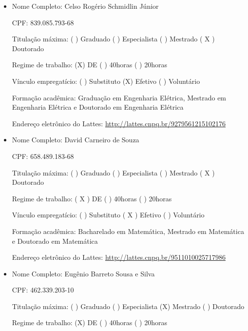 \documentclass{paper}
\def\web#1{\href{#1}{#1}}
\begin{document}
\begin{itemize}
 CPF: 234.457.933-87

 Titulação máxima: (  ) Graduado (  ) Especialista  (X) Mestrado ( ) Doutorado

 Regime de trabalho: (X) DE ( ) 40horas ( ) 20horas

 Vínculo empregatício: (  ) Substituto (X) Efetivo  (  ) Voluntário

 Formação acadêmica: Graduação em Agronomia, Especialização em Segurança do Trabalho e Mestrado em Engenharia Civil

 Endereço eletrônico do Lattes: \web{http://lattes.cnpq.br/3534055362942935}


\item Nome Completo: Celso Rogério Schmidlin Júnior

 CPF: 839.085.793-68

 Titulação máxima: (  ) Graduado  (  ) Especialista  (  ) Mestrado ( X ) Doutorado

 Regime de trabalho: (X) DE  (  ) 40horas (  ) 20horas

 Vínculo empregatício: (  ) Substituto  (X) Efetivo  (  ) Voluntário

 Formação acadêmica: Graduação em Engenharia Elétrica, Mestrado em Engenharia Elétrica e Doutorado em Engenharia
Elétrica

 Endereço eletrônico do Lattes: \web{http://lattes.cnpq.br/9279561215102176}


\item Nome Completo: David Carneiro de Souza

 CPF: 658.489.183-68

 Titulação máxima: (  ) Graduado  (  ) Especialista  (  ) Mestrado ( X ) Doutorado

 Regime de trabalho: ( X ) DE  ( ) 40horas (  ) 20horas

 Vínculo empregatício: (  ) Substituto  ( X ) Efetivo  (  ) Voluntário

 Formação acadêmica: Bacharelado em Matemática, Mestrado em Matemática e Doutorado em Matemática

 Endereço eletrônico do Lattes: \web{http://lattes.cnpq.br/9511010025717986}

\item Nome Completo: Eugênio Barreto Sousa e Silva

 CPF: 462.339.203-10

 Titulação máxima: (  ) Graduado (  ) Especialista  (X) Mestrado ( ) Doutorado

 Regime de trabalho: (X) DE ( ) 40horas ( ) 20horas


\end{itemize}
\end{document}
